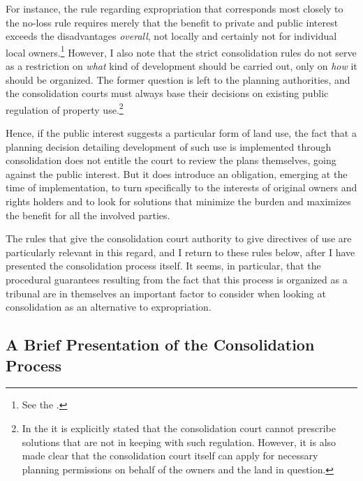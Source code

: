 For instance, the rule regarding expropriation that corresponds most closely to the no-loss rule  
requires merely that the benefit to private and public interest exceeds the disadvantages \emph{overall}, not locally and certainly not for individual local owners.\footnote{See the \cite[2]{ea59}.} However, I also note that the strict consolidation rules do not serve as a restriction on \emph{what} kind of development should be carried out, only on \emph{how} it should be organized. The former question is left to the planning authorities, and the consolidation courts must always base their decisions on existing public regulation of property use.\footnote{In the \cite[3-17]{lca13} it is explicitly stated that the consolidation court cannot prescribe solutions that are not in keeping with such regulation. However, it is also made clear that the consolidation court itself can apply for necessary planning permissions on behalf of the owners and the land in question.}

Hence, if the public interest suggests a particular form of land use, the fact that a planning decision detailing development of such use is implemented through consolidation does not entitle the court to review the plans themselves, going against the public interest. But it does introduce an obligation, emerging at the time of implementation, to turn specifically to the interests of original owners and rights holders and to look for solutions that minimize the burden and maximizes the benefit for all the involved parties.

The rules that give the consolidation court authority to give directives of use are particularly relevant in this regard, and I return to these rules below, after I have presented the consolidation process itself. It seems, in particular, that the procedural guarantees resulting from the fact that this process is organized as a tribunal are in themselves an important factor to consider when looking at consolidation as an alternative to expropriation.

\subsection{A Brief Presentation of the Consolidation Process}\label{subsec:lcp}

